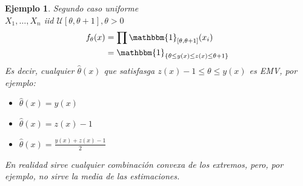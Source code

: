 \documentclass[10pt]{article}
\theoremstyle{plain}
\newtheorem{ej}{Ejemplo}
\theoremstyle{definition}
\begin{document}
\begin{ej} Segundo caso uniforme\\
$X_{1},\ldots,X_{n}$ iid $\mathcal{U}[\theta, \theta +1], \theta > 0$\\
\begin{align*}
f_{\theta}(x) &= \prod \mathbbm{1}_{[\theta,\theta+1]}(x_{i})\\
&= \mathbbm{1}_{\{\theta \le y(x) \le z(x) \le \theta+1\}}
\end{align*}
Es decir, cualquier $\hat{\theta}(x)$ que satisfasga $z(x)-1 \le \theta \le y(x)$ es EMV, por ejemplo:
\begin{itemize}
\item $\hat{\theta}(x) = y(x)$
\item $\hat{\theta}(x) = z(x)-1$
\item $\hat{\theta}(x) = \frac{y(x)+z(x)-1}{2}$
\end{itemize}
En realidad sirve cualquier combinación convexa de los extremos, pero, por ejemplo, no sirve la media de las estimaciones.
\end{ej}
\end{document}
